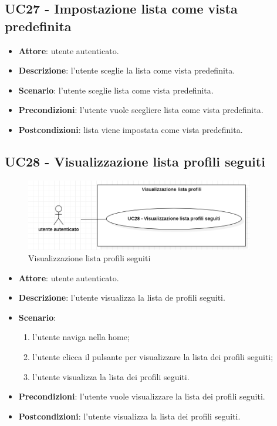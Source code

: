 \subsection{UC27 - Impostazione lista come vista predefinita}
\begin{itemize}
    \item \textbf{Attore}: utente autenticato.
    \item \textbf{Descrizione}: l'utente sceglie la lista come vista predefinita.
    \item \textbf{Scenario}: l'utente sceglie lista come vista predefinita.
    \item \textbf{Precondizioni}: l'utente vuole scegliere lista come vista predefinita.
    \item \textbf{Postcondizioni}: lista viene impostata come vista predefinita.
\end{itemize}

\subsection{UC28 - Visualizzazione lista profili seguiti}
\begin{figure}[!h]
    \includegraphics[width=10cm]{sezioni/Images/UC28.png}
    \centering
    \caption{Visualizzazione lista profili seguiti}
\end{figure}

\begin{itemize}
    \item \textbf{Attore}: utente autenticato.
    \item \textbf{Descrizione}: l'utente visualizza la lista de profili seguiti.
    \item \textbf{Scenario}:
    \begin{enumerate}
        \item l'utente naviga nella home;
        \item l'utente clicca il pulsante per visualizzare la lista dei profili seguiti;
        \item l'utente visualizza la lista dei profili seguiti.
    \end{enumerate}

    \item \textbf{Precondizioni}: l'utente vuole visualizzare la lista dei profili seguiti.
    \item \textbf{Postcondizioni}: l'utente visualizza la lista dei profili seguiti.
\end{itemize}

